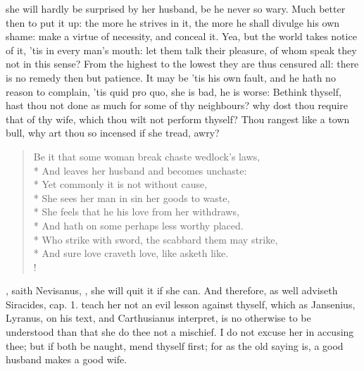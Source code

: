 she will hardly be surprised by her husband, be he never so wary. Much
better then to put it up: the more he strives in it, the more he shall
divulge his own shame: make a virtue of necessity, and conceal it. Yea,
but the world takes notice of it, 'tis in every man's mouth: let them
talk their pleasure, of whom speak they not in this sense? From the
highest to the lowest they are thus censured all: there is no remedy
then but patience. It may be 'tis his own fault, and he hath no reason
to complain, 'tis quid pro quo, she is bad, he is worse: Bethink
thyself, hast thou not done as much for some of thy neighbours? why
dost thou require that of thy wife, which thou wilt not perform
thyself? Thou rangest like a town bull, why art thou so incensed
if she tread, awry?
%
\begin{verse}%
Be it that some woman break chaste wedlock's laws,\\*
And leaves her husband and becomes unchaste:\\*
Yet commonly it is not without cause,\\*
She sees her man in sin her goods to waste,\\*
She feels that he his love from her withdraws,\\*
And hath on some perhaps less worthy placed.\\*
Who strike with sword, the scabbard them may strike,\\*
And sure love craveth love, like asketh like.\\!
\end{verse}%
%

, saith Nevisanus, , she
will quit it if she can. And therefore, as well adviseth Siracides,
cap.  1. teach her not an evil lesson against thyself, which as
Jansenius, Lyranus, on his text, and Carthusianus interpret, is no
otherwise to be understood than that she do thee not a mischief. I do
not excuse her in accusing thee; but if both be naught, mend thyself
first; for as the old saying is, a good husband makes a good wife.

